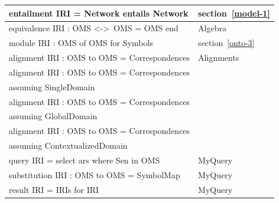 \documentclass[10pt,fleqn,final]{scrreprt}
\newcommand*{\lessthan}{<}
\newcommand*{\greaterthan}{>}
\begin{document}
\begin{tabular}{|l|l|}
entailment IRI = Network entails Network & section~\ref{model-1}\\\hline
equivalence IRI : OMS \lessthan-\greaterthan\ OMS = OMS end  &  Algebra \\\hline
module IRI : OMS of OMS for Symbols  & section~\ref{onto-3} \\\hline
alignment IRI : OMS to OMS = Correspondences  & Alignments \\\hline
alignment IRI : OMS to OMS = Correspondences & \\
\qquad assuming SingleDomain & \cite{OM2014} \\\hline
alignment IRI : OMS to OMS = Correspondences & \\
\qquad assuming GlobalDomain & \cite{OM2014} \\\hline
alignment IRI : OMS to OMS = Correspondences & \\
\qquad assuming ContextualizedDomain & \cite{OM2014} \\\hline
query IRI = select ars where Sen in OMS & MyQuery\\\hline
substitution IRI : OMS to OMS = SymbolMap & MyQuery\\\hline
result IRI = IRIs for IRI & MyQuery\\\hline
\end{tabular}
\end{document}
